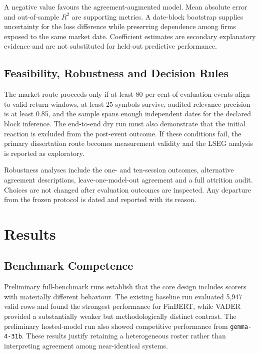 \documentclass[11pt,a4paper,oneside]{book}
\begin{document}
A negative value favours the agreement-augmented model.
Mean absolute error and out-of-sample $R^2$ are supporting metrics.
A date-block bootstrap supplies uncertainty for the loss difference while preserving dependence among firms exposed to the same market date.
Coefficient estimates are secondary explanatory evidence and are not substituted for held-out predictive performance.

\section{Feasibility, Robustness and Decision Rules}
\label{sec:method-robustness}

The market route proceeds only if at least 80 per cent of evaluation events align to valid return windows, at least 25 symbols survive, audited relevance precision is at least 0.85, and the sample spans enough independent dates for the declared block inference.
The end-to-end dry run must also demonstrate that the initial reaction is excluded from the post-event outcome.
If these conditions fail, the primary dissertation route becomes measurement validity and the LSEG analysis is reported as exploratory.

Robustness analyses include the one- and ten-session outcomes, alternative agreement descriptions, leave-one-model-out agreement and a full attrition audit.
Choices are not changed after evaluation outcomes are inspected.
Any departure from the frozen protocol is dated and reported with its reason.

\chapter{Results}
\label{ch:results}

\section{Benchmark Competence}
\label{sec:results-benchmark}

Preliminary full-benchmark runs establish that the core design includes scorers with materially different behaviour.
The existing baseline run evaluated 5,947 valid rows and found the strongest performance for FinBERT, while VADER provided a substantially weaker but methodologically distinct contrast.
The preliminary hosted-model run also showed competitive performance from \texttt{gemma-4-31b}.
These results justify retaining a heterogeneous roster rather than interpreting agreement among near-identical systems.
\end{document}
